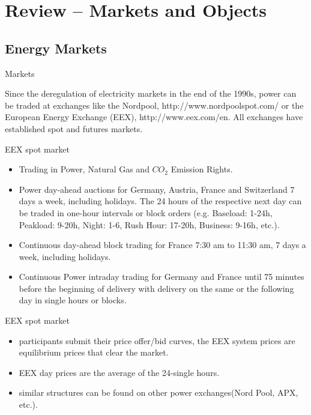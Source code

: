 \section{Review -- Markets and Objects}
\subsection{Energy Markets}

{Markets}

Since the deregulation of electricity markets in the end of the
1990s, power can be traded at exchanges like the Nordpool, http://www.nordpoolspot.com/  or the
European Energy Exchange (EEX), http://www.eex.com/en. All exchanges have established
spot and futures markets.


{EEX spot market}
\begin{itemize}
\item<1->Trading in Power, Natural Gas and $CO_2$ Emission Rights.
\item<2->Power day-ahead auctions for Germany, Austria, France and Switzerland 7 days a week, including holidays. The 24 hours of the respective next day can be traded in one-hour intervals or block orders (e.g. Baseload: 1-24h, Peakload: 9-20h, Night: 1-6, Rush Hour: 17-20h, Business: 9-16h, etc.).
\item<3-> Continuous day-ahead block trading for France 7:30 am to 11:30 am, 7 days a week, including holidays.
\item<4->Continuous Power intraday trading for Germany and France until 75 minutes before the beginning of delivery with delivery on the same or the following day in single hours or blocks.
\end{itemize}

{EEX spot market}
\begin{itemize}
\item<1-> participants submit their price offer/bid curves, the EEX system prices are equilibrium prices that clear the market.
\item<2-> EEX day prices are the average of the 24-single hours.
\item<3-> similar structures can be found on other power exchanges(Nord Pool, APX, etc.).
\end{itemize}


